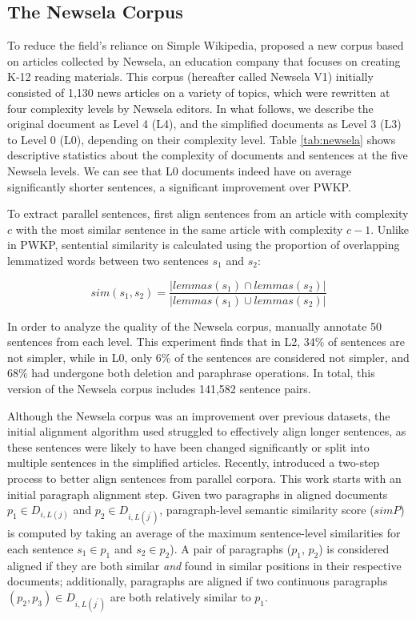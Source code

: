 \documentclass[thesis.tex]{subfiles}
\begin{document}
\subsection{The Newsela Corpus} \label{sec:newsela}

To reduce the field's reliance on Simple Wikipedia, \cite{xu2015problems} proposed a new corpus based on articles collected by Newsela, an education company that focuses on creating K-12 reading materials. This corpus (hereafter called Newsela V1) initially consisted of 1,130 news articles on a variety of topics, which were rewritten at four complexity levels by Newsela editors. In what follows, we describe the original document  as Level 4 (L4), and the simplified documents as Level 3 (L3) to Level 0 (L0), depending on their complexity level. Table \ref{tab:newsela} shows descriptive statistics about the complexity of documents and sentences at the five Newsela levels. We can see that L0 documents indeed have on average significantly shorter sentences, a significant improvement over PWKP.

To extract parallel sentences, \cite{xu2015problems} first align sentences from an article with complexity $c$ with the most similar sentence in the same article with complexity $c - 1$. Unlike in PWKP, sentential similarity is calculated using the proportion of overlapping lemmatized words between two sentences $s_1$ and $s_2$:

\begin{equation}
sim(s_1, s_2) = \frac{\lvert lemmas(s_1) \cap lemmas(s_2) \rvert}{\lvert lemmas(s_1) \cup lemmas(s_2) \rvert}
\end{equation}

In order to analyze the quality of the Newsela corpus, \cite{xu2015problems} manually annotate 50 sentences from each level. This experiment finds that in L2, 34\% of sentences are not simpler, while in L0, only 6\% of the sentences are considered not simpler, and 68\% had undergone both deletion and paraphrase operations. In total, this version of the Newsela corpus includes 141,582 sentence pairs.

Although the Newsela corpus was an improvement over previous datasets, the initial alignment algorithm used struggled to effectively align longer sentences, as these sentences were likely to have been changed significantly or split into multiple sentences in the simplified articles. Recently, \cite{jiang2020neural} introduced a two-step process to better align sentences from parallel corpora. This work starts with an initial paragraph alignment step. Given two paragraphs in aligned documents $p_1 \in D_{i, L(j)}$ and $p_2 \in D_{i, L(j^{\prime})}$, paragraph-level semantic similarity score ($simP$) is computed by taking an average of the maximum sentence-level similarities for each sentence $s_1 \in p_1$ and $s_2 \in p_2$). A pair of paragraphs ($p_1$, $p_2$) is considered aligned if they are both similar \textit{and} found in similar positions in their respective documents; additionally, paragraphs are aligned if two continuous paragraphs $(p_2, p_3) \in D_{i, L(j^{\prime})}$ are both relatively similar to $p_1$. 
\end{document}
